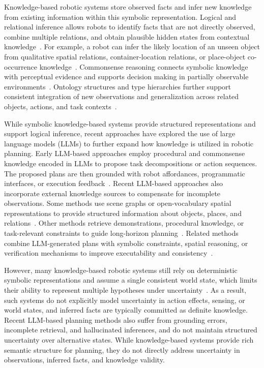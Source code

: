 Knowledge-based robotic systems store observed facts and infer new knowledge from existing information within this symbolic representation. Logical and relational inference allows robots to identify facts that are not directly observed, combine multiple relations, and obtain plausible hidden states from contextual knowledge~\cite{tenorth2012knowledge,liu2020graph}. For example, a robot can infer the likely location of an unseen object from qualitative spatial relations, container-location relations, or place-object co-occurrence knowledge~\cite{kunze2014using,hasegawa2023inferring}. Commonsense reasoning connects symbolic knowledge with perceptual evidence and supports decision making in partially observable environments~\cite{mota2021integrated,zhang2024icorpp,daruna2019robocse}. Ontology structures and type hierarchies further support consistent integration of new observations and generalization across related objects, actions, and task contexts~\cite{mitrevsk2021ontology,olivares2019review,manzoor2021ontology}.

While symbolic knowledge-based systems provide structured representations and support logical inference, recent approaches have explored the use of large language models (LLMs) to further expand how knowledge is utilized in robotic planning. Early LLM-based approaches employ procedural and commonsense knowledge encoded in LLMs to propose task decompositions or action sequences. The proposed plans are then grounded with robot affordances, programmatic interfaces, or execution feedback~\cite{ahn2022can,huang2022inner,singh2023progprompt,liang2023code,ding2023task}. Recent LLM-based approaches also incorporate external knowledge sources to compensate for incomplete observations. Some methods use scene graphs or open-vocabulary spatial representations to provide structured information about objects, places, and relations~\cite{gu2024conceptgraphs,leanza2025conceptbot}. Other methods retrieve demonstrations, procedural knowledge, or task-relevant constraints to guide long-horizon planning~\cite{singh2025adaptbot,zhouenhancing,xu2024p,wang2025instructrag,kumar2026open}. Related methods combine LLM-generated plans with symbolic constraints, spatial reasoning, or verification mechanisms to improve executability and consistency~\cite{huang2023voxposer,dai2024optimal,liu2025delta,paulius2025bootstrapping,quartey2025verifiably}.

However, many knowledge-based robotic systems still rely on deterministic symbolic representations and assume a single consistent world state, which limits their ability to represent multiple hypotheses under uncertainty~\cite{yang2018peorl,bouguerra2008monitoring}. As a result, such systems do not explicitly model uncertainty in action effects, sensing, or world states, and inferred facts are typically committed as definite knowledge. Recent LLM-based planning methods also suffer from grounding errors, incomplete retrieval, and hallucinated inferences, and do not maintain structured uncertainty over alternative states. While knowledge-based systems provide rich semantic structure for planning, they do not directly address uncertainty in observations, inferred facts, and knowledge validity. 


